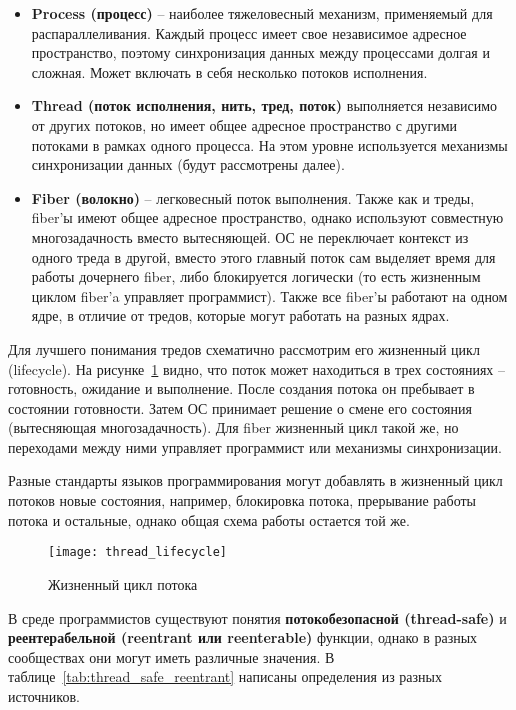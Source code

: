 \begin{itemize}
    \item\textbf{Process (процесс)} -- наиболее тяжеловесный механизм, применяемый для распараллеливания.
    Каждый процесс имеет свое независимое адресное пространство, поэтому синхронизация данных между процессами долгая и сложная.
    Может включать в себя несколько потоков исполнения.
    \item\textbf{Thread (поток исполнения, нить, тред, поток)} выполняется независимо от других потоков, но имеет общее адресное пространство с другими потоками в рамках одного процесса.
    На этом уровне используется механизмы синхронизации данных (будут рассмотрены далее).
    \item\textbf{Fiber (волокно)} -- легковесный поток выполнения.
    Также как и треды, fiber'ы имеют общее адресное пространство, однако используют совместную многозадачность вместо вытесняющей.
    ОС не переключает контекст из одного треда в другой, вместо этого главный поток сам выделяет время для работы дочернего fiber, либо блокируется логически (то есть жизненным циклом fiber'a управляет программист).
    Также все fiber'ы работают на одном ядре, в отличие от тредов, которые могут работать на разных ядрах.
\end{itemize}

Для лучшего понимания тредов схематично рассмотрим его жизненный цикл (lifecycle).
На рисунке~\ref{fig:thread-lifesycle} видно, что поток может находиться в трех состояниях -- готовность, ожидание и выполнение.
После создания потока он пребывает в состоянии готовности.
Затем ОС принимает решение о смене его состояния (вытесняющая многозадачность).
Для fiber жизненный цикл такой же, но переходами между ними управляет программист или механизмы синхронизации.

Разные стандарты языков программирования могут добавлять в жизненный цикл потоков новые состояния, например, блокировка потока, прерывание работы потока и остальные, однако общая схема работы остается той же.

\begin{figure}[H]
    \texttt{[image: thread\_lifecycle]}
    \caption{Жизненный цикл потока}
    \label{fig:thread-lifesycle}
\end{figure}

\sloppy
В среде программистов существуют понятия \textbf{потокобезопасной (thread-safe)} и \textbf{реентерабельной (reentrant или reenterable)} функции, однако в разных сообществах они могут иметь различные значения.
В таблице~\ref{tab:thread_safe_reentrant} написаны определения из разных источников.

